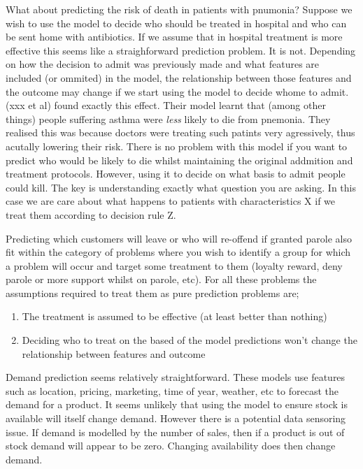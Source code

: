 \documentclass[11pt,a4paper,oneside]{book}
\begin{document}
What about predicting the risk of death in patients with pnumonia? Suppose we wish to use the model to decide who should be treated in hospital and who can be sent home with antibiotics. If we assume that in hospital treatment is more effective this seems like a straighforward prediction problem. It is not. Depending on how the decision to admit was previously made and what features are included (or ommited) in the model, the relationship between those features and the outcome may change if we start using the model to decide whome to admit. (xxx et al) found exactly this effect. Their model learnt that (among other things) people suffering asthma were \emph{less} likely to die from pnemonia. They realised this was because doctors were treating such patints very agressively, thus acutally lowering their risk. There is no problem with this model if you want to predict who would be likely to die whilst maintaining the original addmition and treatment protocols. However, using it to decide on what basis to admit people could kill. The key is understanding exactly what question you are asking. In this case we are care about what happens to patients with characteristics X if we treat them according to decision rule Z.   

Predicting which customers will leave or who will re-offend if granted parole also fit within the category of problems where you wish to identify a group for which a problem will occur and target some treatment to them (loyalty reward, deny parole or more support whilst on parole, etc). For all these problems the assumptions required to treat them as pure prediction problems are;
\begin{enumerate}
\item The treatment is assumed to be effective (at least better than nothing)
\item Deciding who to treat on the based of the model predictions won't change the relationship between features and outcome 
\end{enumerate}

Demand prediction seems relatively straightforward. These models use features such as location, pricing, marketing, time of year, weather, etc to forecast the demand for a product. It seems unlikely that using the model to ensure stock is available will itself change demand. However there is a potential data sensoring issue. If demand is modelled by the number of sales, then if a product is out of stock demand will appear to be zero. Changing availability does then change demand.
   
\end{document}
